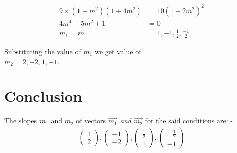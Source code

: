 \documentclass[conference]{IEEEtran}
\newcommand{\myvec}[1]{\ensuremath{\begin{pmatrix}#1\end{pmatrix}}}
\begin{document}
\begin{align}
9 \times (1 + m^2) (1 + 4 m^2) & = 10 ( 1 + 2 m^2)^2\\ 
4 m^4 - 5 m^2 + 1 &=0\\ 
m_{1} = m &= 1, -1,\frac{1}{2},\frac{-1}{2}
\end{align}

Substituting the value of $ m_{1}$ we get value of\\
$ m_{2} = 2, -2, 1, -1$.\\

\section{Conclusion}
The slopes $ m_{1}$ and $ m_{2} $ of vectors \textit{$\vec{m_{1}}$  and    $\vec{m_{2}}$} for the said conditions are: -
 \begin{align}
\myvec{1 \\ 2} , \myvec{-1 \\ -2} ,\myvec{ \frac{1}{2}\\1} ,\myvec{- \frac{1}{2}\\ -1}
\end{align}
\end{document}
